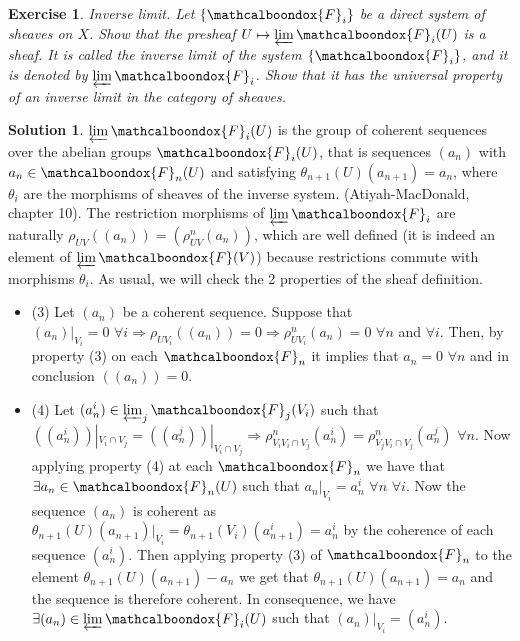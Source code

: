 \documentclass[12pt]{article}
\newcommand{\imp}{\ensuremath{\Rightarrow}}
\newtheorem{ex}{Exercise}[section]
\theoremstyle{definition}
\newtheorem*{sol}{Solution}
\newcommand{\sF}{\ensuremath{\mathcalboondox{F}}}
\begin{document}
\begin{ex}
	Inverse limit. Let $\{\sF_i\}$ be a direct system of sheaves on $X$. Show that the presheaf $U \mapsto \varprojlim \sF_i (U)$ is a sheaf. It is called the inverse limit of the system $\{\sF_i\}$, and it is denoted by $\varprojlim \sF_i$. Show that it has the universal property of an inverse limit in the category of sheaves.
\end{ex}

\begin{sol}
	$\varprojlim \sF_i (U)$ is the group of coherent sequences over the abelian groups $\sF_i(U)$, that is sequences $(a_n)$ with $a_n \in \sF_n(U)$ and satisfying $\theta_{n+1}(U)(a_{n+1}) = a_n$, where $\theta_i$ are the morphisms of sheaves of the inverse system. (Atiyah-MacDonald, chapter 10). The restriction morphisms of $\varprojlim \sF_i$ are naturally $\rho_{UV}((a_n)) = (\rho^n_{UV}(a_n))$, which are well defined (it is indeed an element of $\varprojlim \sF(V)$) because restrictions commute with morphisms $\theta_i$. As usual, we will check the 2 properties of the sheaf definition.
	\begin{itemize}
		\item (3) Let $(a_n)$ be a coherent sequence. Suppose that $(a_n)|_{V_i} = 0 \, \, \forall i \imp \rho_{UV_i}((a_n)) = 0 \imp \rho^n_{UV_i}(a_n) = 0 \, \, \forall n$ and $\forall i$. Then, by property (3) on each $\sF_n$ it implies that $a_n = 0 \, \, \forall n$ and in conclusion $((a_n)) = 0$.

		\item (4) Let $(a^i_n) \in \varprojlim_j \sF_j(V_i)$ such that $((a^i_n))|_{V_i \cap V_j} =((a^j_n))|_{V_i \cap V_j} \imp \rho^n_{V_i V_i \cap V_j}(a^i_n) = \rho^n_{V_j V_i \cap V_j}(a^j_n) \, \, \forall n$. Now applying property (4) at each $\sF_n$ we have that $\exists a_n \in \sF_n(U)$ such that $a_n|_{V_i} = a^i_n \, \, \forall n \, \, \forall i$. Now the sequence $(a_n)$ is coherent as $\theta_{n+1}(U)(a_{n+1})|_{V_i} = \theta_{n+1}(V_i)(a^i_{n+1}) = a_n^i$ by the coherence of each sequence $(a_n^i)$. Then applying property (3) of $\sF_n$ to the element $\theta_{n+1}(U)(a_{n+1})-a_n$ we get that $\theta_{n+1}(U)(a_{n+1}) = a_n$ and the sequence is therefore coherent. In consequence, we have $\exists (a_n) \in \varprojlim \sF_i (U)$ such that $(a_n)|_{V_i} = (a_n^i)$.
	\end{itemize}


\end{sol}
\end{document}

